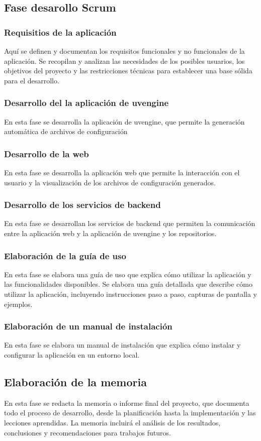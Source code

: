 \documentclass[12pt, a4paper, twoside]{article}
\begin{document}
\subsection{Fase desarollo Scrum}
\subsubsection{Requisitios de la aplicación }
Aquí se definen y documentan los requisitos funcionales y no funcionales de la aplicación. Se recopilan y analizan las 
necesidades de los posibles usuarios, los objetivos del proyecto y las restricciones técnicas para establecer una base 
sólida para el desarrollo.
\subsubsection{Desarrollo del la aplicación de uvengine }
En esta fase se desarrolla la aplicación de uvengine, que permite la generación automática de archivos de configuración
\subsubsection{Desarrollo de la web}
En esta fase se desarrolla la aplicación web que permite la interacción con el usuario y la visualización de los archivos de configuración generados.
\subsubsection{Desarrollo de los servicios de backend}
En esta fase se desarrollan los servicios de backend que permiten la comunicación entre la aplicación web y la aplicación de uvengine y los repositorios.
\subsubsection{Elaboración de la guía de uso}
En esta fase se elabora una guía de uso que explica cómo utilizar la aplicación y las funcionalidades disponibles.
Se elabora una guía detallada que describe cómo utilizar la aplicación, incluyendo instrucciones paso a paso, capturas 
de pantalla y ejemplos. 
\subsubsection{Elaboración de un manual de instalación}
En esta fase se elabora un manual de instalación que explica cómo instalar y configurar la aplicación en un entorno local.
\subsection{Elaboración de la memoria}
En esta fase se redacta la memoria o informe final del proyecto, que documenta todo el proceso de desarrollo, desde la 
planificación hasta la implementación y las lecciones aprendidas. La memoria incluirá el análisis de los resultados, 
conclusiones y recomendaciones para trabajos futuros. 
\end{document}
